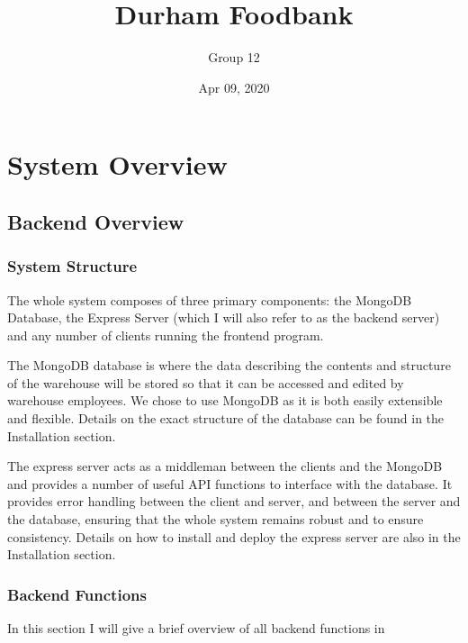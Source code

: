 \documentclass[letterpaper,10pt,english]{sphinxmanual}
\title{Durham Foodbank}
\date{Apr 09, 2020}
\author{Group 12}
\begin{document}
\pagestyle{empty}
\sphinxmaketitle
\pagestyle{plain}
\sphinxtableofcontents
\pagestyle{normal}
\label{\detokenize{index::doc}}



\chapter{System Overview}
\label{\detokenize{index:system-overview}}

\section{Backend Overview}
\label{\detokenize{docs/System_Overview/Backend_overview:backend-overview}}\label{\detokenize{docs/System_Overview/Backend_overview::doc}}

\subsection{System Structure}
\label{\detokenize{docs/System_Overview/Backend_overview:system-structure}}
The whole system composes of three primary components: the MongoDB
Database, the Express Server (which I will also refer to as the back\sphinxhyphen{}end
server) and any number of clients running the front\sphinxhyphen{}end program.

The MongoDB database is where the data describing the contents and
structure of the warehouse will be stored so that it can be accessed and
edited by warehouse employees. We chose to use MongoDB as it is both
easily extensible and flexible. Details on the exact structure of the
database can be found in the Installation section.

The express server acts as a middle\sphinxhyphen{}man between the clients and the
MongoDB and provides a number of useful API functions to interface with
the database. It provides error handling between the client and server,
and between the server and the database, ensuring that the whole system
remains robust and to ensure consistency. Details on how to install and
deploy the express server are also in the Installation section.


\subsection{Back\sphinxhyphen{}end Functions}
\label{\detokenize{docs/System_Overview/Backend_overview:back-end-functions}}
In this section I will give a brief overview of all back\sphinxhyphen{}end functions
in 
\end{document}
